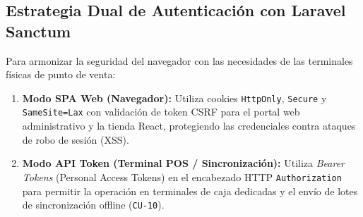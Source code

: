 \subsection{Estrategia Dual de Autenticación con Laravel Sanctum}
Para armonizar la seguridad del navegador con las necesidades de las terminales físicas de punto de venta:
\begin{enumerate}
    \item \textbf{Modo SPA Web (Navegador):} Utiliza cookies \texttt{HttpOnly}, \texttt{Secure} y \texttt{SameSite=Lax} con validación de token CSRF para el portal web administrativo y la tienda React, protegiendo las credenciales contra ataques de robo de sesión (XSS).
    \item \textbf{Modo API Token (Terminal POS / Sincronización):} Utiliza \textit{Bearer Tokens} (Personal Access Tokens) en el encabezado HTTP \texttt{Authorization} para permitir la operación en terminales de caja dedicadas y el envío de lotes de sincronización offline (\texttt{CU-10}).
\end{enumerate}
